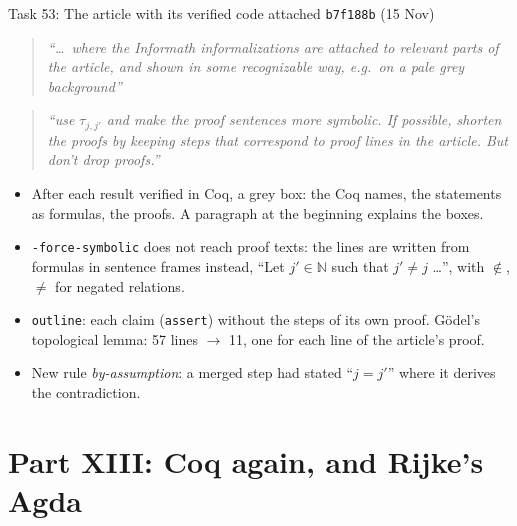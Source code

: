 \documentclass[10pt,aspectratio=169]{beamer}
\newcommand{\bad}[1]{\textcolor{warn}{#1}}
\newcommand{\ok}[1]{\textcolor{good}{#1}}
\newcommand{\commit}[1]{\texttt{\footnotesize #1}}
\newcommand{\prompt}[1]{\begin{quote}\small\itshape ``#1''\end{quote}}
\begin{document}
\begin{frame}{Task 53: The article with its verified code attached}
  \commit{b7f188b} (15 Nov)
  \prompt{\ldots\ where the Informath informalizations are attached to relevant parts of the
  article, and shown in some recognizable way, e.g.\ on a pale grey background}
  \prompt{use $\tau_{j,j'}$ and make the proof sentences more symbolic. If possible, shorten the
  proofs by keeping steps that correspond to proof lines in the article. But don't drop proofs.}
  \begin{itemize}\small
    \item After each result verified in Coq, a grey box: the Coq names, the statements as
          formulas, the proofs. A paragraph at the beginning explains the boxes.
    \item \bad{\texttt{-force-symbolic} does not reach proof texts}: the lines are written from
          formulas in sentence frames instead, ``Let $j' \in \mathbb{N}$ such that
          $j' \neq j$ \ldots'', with $\notin$, $\neq$ for negated relations.
    \item \texttt{outline}: each claim (\texttt{assert}) without the steps of its own proof.
          Gödel's topological lemma: \ok{57 lines $\to$ 11}, one for each line of the article's
          proof.
    \item New rule \emph{by-assumption}: a merged step had stated \bad{``$j = j'$''} where it
          derives the contradiction.
  \end{itemize}
\end{frame}

\section{Part XIII: Coq again, and Rijke's Agda}
\end{document}
